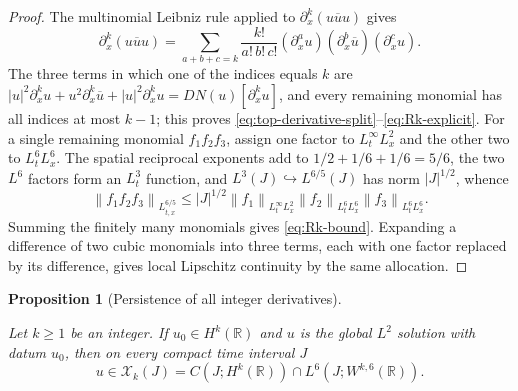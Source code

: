 \documentclass[11pt,oneside]{book}
\providecommand{\uses}[1]{}
\newtheorem{proposition}[theorem]{Proposition}
\theoremstyle{definition}
\theoremstyle{remark}
\newcommand{\R}{\mathbb R}
\newcommand{\1}{\mathbf 1}
\newcommand{\norm}[1]{\left\lVert #1\right\rVert}
\begin{document}
\begin{proof}
\uses{lem:cubic-derivative-map}
The multinomial Leibniz rule applied to $\partial_x^k(u\overline u u)$ gives
\[
 \partial_x^k(u\overline u u)
 =\sum_{a+b+c=k}\frac{k!}{a!\,b!\,c!}
   (\partial_x^au)(\partial_x^b\overline u)(\partial_x^cu).
\]
The three terms in which one of the indices equals $k$ are
$|u|^2\partial_x^ku+u^2\partial_x^k\overline u+|u|^2\partial_x^ku
=DN(u)[\partial_x^ku]$, and every remaining monomial has all indices at most
$k-1$; this proves \eqref{eq:top-derivative-split}--\eqref{eq:Rk-explicit}.
For a single remaining monomial $f_1f_2f_3$, assign one factor to
$L^\infty_tL^2_x$ and the other two to $L^6_tL^6_x$.  The spatial reciprocal
exponents add to $1/2+1/6+1/6=5/6$, the two $L^6$ factors form an $L^3_t$
function, and $L^3(J)\hookrightarrow L^{6/5}(J)$ has norm $|J|^{1/2}$, whence
\[
 \norm{f_1f_2f_3}_{L^{6/5}_{t,x}}
 \le |J|^{1/2}\norm{f_1}_{L^\infty_tL^2_x}
              \norm{f_2}_{L^6_tL^6_x}
              \norm{f_3}_{L^6_tL^6_x}.
\]
Summing the finitely many monomials gives \eqref{eq:Rk-bound}.  Expanding a
difference of two cubic monomials into three terms, each with one factor
replaced by its difference, gives local Lipschitz continuity by the same
allocation.
\end{proof}

\begin{proposition}[Persistence of all integer derivatives]
\label{prop:Hk-persistence}
\uses{def:Xk-space, lem:cubic-Hk-leibniz, thm:GWP}
Let $k\ge1$ be an integer.  If $u_0\in H^k(\R)$ and $u$ is the global $L^2$
solution with datum $u_0$, then on every compact time interval $J$
\[
 u\in\mathcal X_k(J)=C(J;H^k(\R))\cap L^6(J;W^{k,6}(\R)).
\]
\end{proposition}
\end{document}
